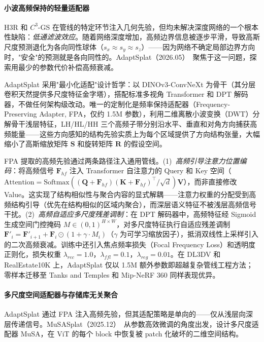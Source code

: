\paragraph{小波高频保持的轻量适配器}

H3R 和 $C^3$-GS 在管线的特定环节注入几何先验，但均未解决深度网络的一个根本性缺陷：\emph{低通滤波效应}。随着网络深度增加，高频边界信息被逐步平滑，导致高斯尺度预测退化为各向同性球体（$s_x \approx s_y \approx s_z$）——因为网络不确定局部边界方向时，"安全"的预测就是各向同性的。AdaptSplat（2026.05）~\cite{2605_10239}聚焦于这一问题，探索用最少的参数代价补偿高频衰减。

AdaptSplat 采用"最小化适配"设计哲学：以 DINOv3-ConvNeXt 为骨干（其分层卷积天然提供多尺度特征金字塔），搭配标准多视角 Transformer 和 DPT 解码器，不做任何架构级改动。唯一的定制化是频率保持适配器（Frequency-Preserving Adapter, FPA，仅约 1.5M 参数），利用二维离散小波变换（DWT）分解骨干浅层特征，LH/HL/HH 三个高频子带分别沿水平、垂直和对角方向捕获高频能量——这些方向感知的结构先验实质上为每个区域提供了方向结构张量，大幅缩小了高斯缩放矩阵 $\mathbf{S}$ 和旋转矩阵 $\mathbf{R}$ 的假设空间。

FPA 提取的高频先验通过两条路径注入通用管线。(1)~\emph{高频引导注意力位置编码}：将高频信号 $\mathbf{F}_{hf}$ 注入 Transformer 自注意力的 Query 和 Key 空间（$\text{Attention} = \text{Softmax}((\mathbf{Q} + \mathbf{F}_{hf})(\mathbf{K} + \mathbf{F}_{hf})^\top / \sqrt{d})\mathbf{V}$），而非直接修改 Value。这实现了结构相似性与聚合内容的显式解耦——注意力权重的分配受到高频结构引导（优先在结构相似的区域内聚合），而深层语义特征不被浅层高频信号干扰。(2)~\emph{高频自适应多尺度残差调制}：在 DPT 解码器中，高频特征经 Sigmoid 生成空间门控掩码 $M \in (0,1)^{H \times W}$，对多尺度特征执行自适应残差调制 $\mathbf{F}'_i = \mathbf{F}'_{i+1} + \mathbf{F}_i \odot (1 + \gamma \cdot M_i)$（$\gamma$ 为可学习缩放因子），抵消双线性上采样引入的二次高频衰减。训练中还引入焦点频率损失（Focal Frequency Loss）和透明度正则化，损失权重 $\lambda_{rec} = 1.0$，$\lambda_{ffl} = 0.1$，$\lambda_{reg} = 0.01$。在 DL3DV 和 RealEstate10K 上，AdaptSplat 仅以 1.5M 额外参数即超越复杂管线工程方法；零样本迁移至 Tanks and Temples 和 Mip-NeRF 360 同样表现优异。

\paragraph{多尺度空间适配器与存储库无关聚合}

AdaptSplat 通过 FPA 注入高频先验，但其适配策略是单向的——仅从浅层向深层传递信号。MuSASplat（2025.12）~\cite{2512_07165}从参数高效微调的角度出发，设计多尺度适配器 MuSA，在 ViT 的每个 block 中恢复被 patch 化破坏的二维空间结构。


